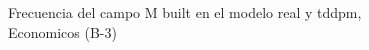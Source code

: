 \begin{figure}[H]
    \centering
    
    \caption{Frecuencia del campo M built en el modelo real y tddpm, Economicos (B-3)}
    \label{frecuency-M Built-tddpm_mlp}
\end{figure}